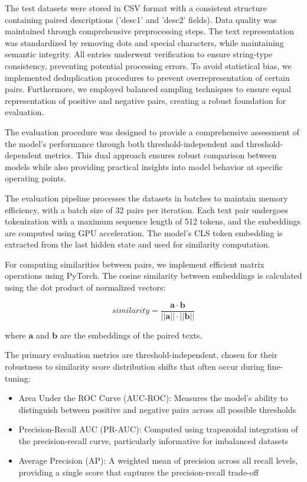 The test datasets were stored in CSV format with a consistent structure containing paired descriptions ('desc1' and 'desc2' fields). Data quality was maintained through comprehensive preprocessing steps. The text representation was standardized by removing dots and special characters, while maintaining semantic integrity. All entries underwent verification to ensure string-type consistency, preventing potential processing errors. To avoid statistical bias, we implemented deduplication procedures to prevent overrepresentation of certain pairs. Furthermore, we employed balanced sampling techniques to ensure equal representation of positive and negative pairs, creating a robust foundation for evaluation.

The evaluation procedure was designed to provide a comprehensive assessment of the model's performance through both threshold-independent and threshold-dependent metrics. This dual approach ensures robust comparison between models while also providing practical insights into model behavior at specific operating points.

The evaluation pipeline processes the datasets in batches to maintain memory efficiency, with a batch size of 32 pairs per iteration. Each text pair undergoes tokenization with a maximum sequence length of 512 tokens, and the embeddings are computed using GPU acceleration. The model's CLS token embedding is extracted from the last hidden state and used for similarity computation.

For computing similarities between pairs, we implement efficient matrix operations using PyTorch. The cosine similarity between embeddings is calculated using the dot product of normalized vectors:

\begin{equation}
similarity = \frac{\mathbf{a} \cdot \mathbf{b}}{||\mathbf{a}|| \cdot ||\mathbf{b}||}
\end{equation}

where $\mathbf{a}$ and $\mathbf{b}$ are the embeddings of the paired texts.

The primary evaluation metrics are threshold-independent, chosen for their robustness to similarity score distribution shifts that often occur during fine-tuning:

\begin{itemize}
    \item Area Under the ROC Curve (AUC-ROC): Measures the model's ability to distinguish between positive and negative pairs across all possible thresholds
    \item Precision-Recall AUC (PR-AUC): Computed using trapezoidal integration of the precision-recall curve, particularly informative for imbalanced datasets
    \item Average Precision (AP): A weighted mean of precision across all recall levels, providing a single score that captures the precision-recall trade-off
\end{itemize}

